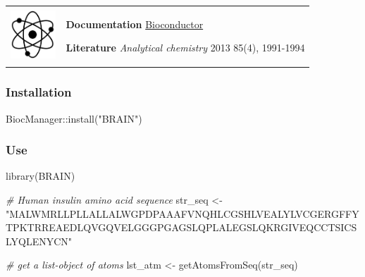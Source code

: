 \documentclass[
]{book}
\newenvironment{Shaded}{\begin{snugshade}}{\end{snugshade}}
\newcommand{\CommentTok}[1]{\textcolor[rgb]{0.56,0.35,0.01}{\textit{#1}}}
\newcommand{\FunctionTok}[1]{\textcolor[rgb]{0.00,0.00,0.00}{#1}}
\newcommand{\NormalTok}[1]{#1}
\newcommand{\OtherTok}[1]{\textcolor[rgb]{0.56,0.35,0.01}{#1}}
\newcommand{\SpecialCharTok}[1]{\textcolor[rgb]{0.00,0.00,0.00}{#1}}
\newcommand{\StringTok}[1]{\textcolor[rgb]{0.31,0.60,0.02}{#1}}
\begin{document}
\hfill\break

\begin{longtable}[]{@{}
  >{\raggedright\arraybackslash}p{}
  >{\raggedright\arraybackslash}p{}@{}}
\toprule\noalign{}
\endhead
\bottomrule\noalign{}
\endlastfoot
\includegraphics[width=\textwidth,height=0.70833in]{images/05.png} & \textbf{Documentation} \textbar{} \href{https://bioconductor.org/packages/release/bioc/manuals/BRAIN/man/BRAIN.pdf}{Bioconductor}

\textbf{Literature} \textbar{} \emph{Analytical chemistry} 2013 85(4), 1991-1994 \\
\end{longtable}

\hfill\break

\hypertarget{installation-1}{%
\subsubsection*{Installation}\label{installation-1}}

\begin{Shaded}
\begin{Highlighting}[]
\NormalTok{BiocManager}\SpecialCharTok{::}\FunctionTok{install}\NormalTok{(}\StringTok{"BRAIN"}\NormalTok{)}
\end{Highlighting}
\end{Shaded}

\hypertarget{use}{%
\subsubsection*{Use}\label{use}}

\begin{Shaded}
\begin{Highlighting}[]
\FunctionTok{library}\NormalTok{(BRAIN)}

\CommentTok{\# Human insulin amino acid sequence}
\NormalTok{str\_seq }\OtherTok{\textless{}{-}} \StringTok{"MALWMRLLPLLALLALWGPDPAAAFVNQHLCGSHLVEALYLVCGERGFFYTPKTRREAEDLQVGQVELGGGPGAGSLQPLALEGSLQKRGIVEQCCTSICSLYQLENYCN"}

\CommentTok{\# get a list{-}object of atoms}
\NormalTok{lst\_atm }\OtherTok{\textless{}{-}} \FunctionTok{getAtomsFromSeq}\NormalTok{(str\_seq) }
\end{Highlighting}
\end{Shaded}
\end{document}
